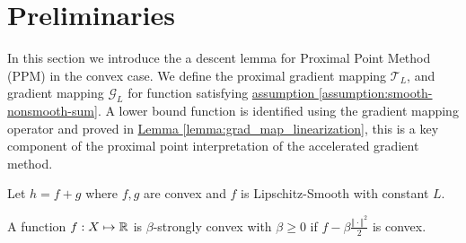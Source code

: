 \documentclass[12pt]{article}
\begin{document}
    
\section{Preliminaries}\label{sec:preliminaries}
    In this section we introduce the a descent lemma for Proximal Point Method (PPM) in the convex case. 
    We define the proximal gradient mapping $\mathcal T_L$, and gradient mapping $\mathcal G_L$ for function satisfying 
    \hyperref[assumption:smooth-nonsmooth-sum]
    {assumption \ref*{assumption:smooth-nonsmooth-sum}}. 
    A lower bound function is identified using the gradient mapping operator and proved in
    \hyperref[lemma:grad_map_linearization]{Lemma \ref*{lemma:grad_map_linearization}}, 
    this is a key component of the proximal point interpretation of the accelerated gradient method. 
    \begin{assumption}\label{assumption:smooth-nonsmooth-sum}
        Let $h = f + g$ where $f, g$ are convex and $f$ is Lipschitz-Smooth with constant $L$. 
    \end{assumption}
    \begin{definition}
        A function $f: X \mapsto \mathbb R$ is $\beta$-strongly convex
        with $\beta\geq 0$ if $f - \beta \frac{\Vert \cdot\Vert^2}{2}$ is convex.
    \end{definition}

 
\end{document}
